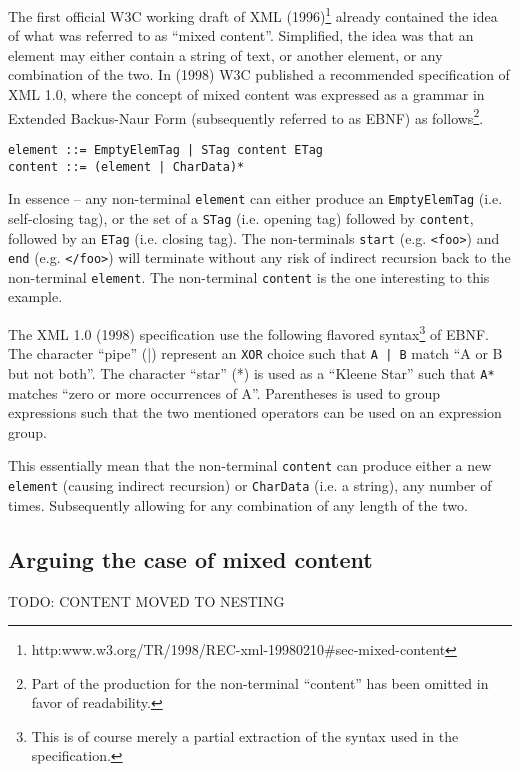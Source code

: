 \documentclass{scrreprt}
\begin{document}

The first official W3C working draft of XML (1996)\footnote{http:\/\/www.w3.org/TR/1998/REC-xml-19980210\#sec-mixed-content} already contained the idea of what was referred to as ``mixed content''. Simplified, the idea was that an element may either contain a string of text, or another element, or any combination of the two. In (1998) W3C published a recommended specification of XML 1.0, where the concept of mixed content was expressed as a grammar in Extended Backus-Naur Form (subsequently referred to as EBNF) as follows\footnote{Part of the production for the non-terminal ``content'' has been omitted in favor of readability.}.

\begin{lstlisting}
element ::= EmptyElemTag | STag content ETag 
content ::= (element | CharData)*
\end{lstlisting}

In essence -- any non-terminal \texttt{element} can either produce an \texttt{EmptyElemTag} (i.e. self-closing tag), or the set of a \texttt{STag} (i.e. opening tag) followed by \texttt{content}, followed by an \texttt{ETag} (i.e. closing tag). The non-terminals \texttt{start} (e.g. \texttt{<foo>}) and \texttt{end} (e.g. \texttt{</foo>}) will terminate without any risk of indirect recursion back to the non-terminal \texttt{element}. The non-terminal \texttt{content} is the one interesting to this example.

The XML 1.0 (1998) specification use the following flavored syntax\footnote{This is of course merely a partial extraction of the syntax used in the specification.} of EBNF. The character ``pipe'' (|) represent an \texttt{XOR} choice such that \texttt{A | B} match ``A or B but not both''. The character ``star'' (*) is used as a ``Kleene Star'' such that \texttt{A*} matches ``zero or more occurrences of A''. Parentheses is used to group expressions such that the two mentioned operators can be used on an expression group.

This essentially mean that the non-terminal \texttt{content} can produce either a new \texttt{element} (causing indirect recursion) or \texttt{CharData} (i.e. a string), any number of times. Subsequently allowing for any combination of any length of the two.



\subsection{Arguing the case of mixed content}
TODO: CONTENT MOVED TO NESTING
\end{document}
